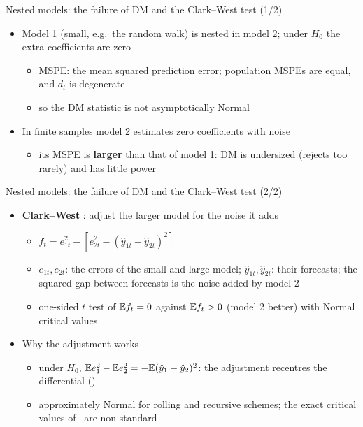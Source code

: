 \begin{frame}{Nested models: the failure of DM and the Clark--West test (1/2)}
\itemsize{\small}
\begin{itemize}
    \item Model 1 (small, e.g.\ the random walk) is nested in model 2; under $H_0$ the extra coefficients are zero
    \begin{itemize}
        \item MSPE: the mean squared prediction error; population MSPEs are equal, and $d_t$ is degenerate
        \item so the DM statistic is not asymptotically Normal 
    \end{itemize}
    \item In finite samples model 2 estimates zero coefficients with noise
    \begin{itemize}
        \item its MSPE is \textbf{larger} than that of model 1: DM is undersized (rejects too rarely) and has little power
    \end{itemize}
\end{itemize}
\end{frame}

\begin{frame}{Nested models: the failure of DM and the Clark--West test (2/2)}
\itemsize{\small}
\begin{itemize}
    \item \textbf{Clark--West} : adjust the larger model for the noise it adds
    \begin{itemize}
        \item $f_t = e_{1t}^2 - [e_{2t}^2 - (\hat y_{1t} - \hat y_{2t})^2]$
        \item $e_{1t}, e_{2t}$: the errors of the small and large model; $\hat y_{1t}, \hat y_{2t}$: their forecasts; the squared gap between forecasts is the noise added by model 2
        \item one-sided $t$ test of $\mathbb{E} f_t = 0$ against $\mathbb{E} f_t > 0$ (model 2 better) with Normal critical values
    \end{itemize}
    \item Why the adjustment works
    \begin{itemize}
        \item under $H_0$, $\mathbb{E} e_1^2 - \mathbb{E} e_2^2 = -\mathbb{E}(\hat y_1 - \hat y_2)^2$: the adjustment recentres the differential ()
        \item approximately Normal for rolling and recursive schemes; the exact critical values of \ are non-standard
    \end{itemize}
\end{itemize}
\end{frame}

